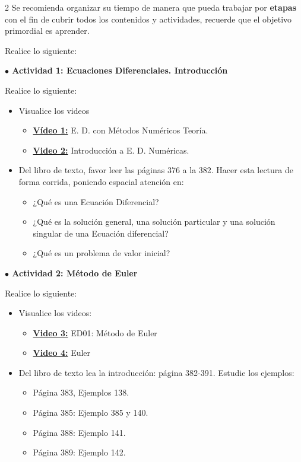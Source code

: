 \documentclass[10pt,letterpaper]{article}
\newcommand{\URLVideoUno}{\href{https://youtu.be/ajYx1_p9ENk?si=HcU6I23R4iOyACXt}{\textbf{Vídeo 1:}} E. D. con Métodos Numéricos Teoría}
\newcommand{\URLVideoDos}{\href{https://drive.google.com/file/d/16GAE1hLeBJZZ_wsUSGfVm6QBWMIPFX5s/view}{\textbf{Video 2:}} Introducción a E. D. Numéricas}
\newcommand{\URLVideoTres}{\href{https://youtu.be/-z-xH9WdpSs}{\textbf{Video 3:}} ED01: Método de Euler}
\newcommand{\URLVideoCuatro}{\href{https://drive.google.com/file/d/1cLupAmFHfxKZ5KFbxQljqTgPBWySScXh/view}{\textbf{Video 4:}} Euler}
\begin{document}


\newpage

\begin{multicols}{2}
Se recomienda organizar su tiempo de manera que pueda trabajar por \textbf{etapas} con el fin de cubrir todos los contenidos y actividades, recuerde que el objetivo primordial es aprender. 
	 

Realice lo siguiente:
	
{\color{actividades} \textbf{  $\bullet$ Actividad 1: Ecuaciones Diferenciales. Introducción}}

Realice lo siguiente:
\begin{itemize}
\item Visualice los videos
\begin{itemize}
\item \URLVideoUno.
\item \URLVideoDos.
\end{itemize}
\item Del libro de texto, favor leer las páginas 376 a la 382. Hacer esta lectura de forma corrida, poniendo espacial atención en:
\begin{itemize}
\item ¿Qué es una Ecuación Diferencial?
\item ¿Qué es la solución general, una solución particular y una solución singular de una Ecuación diferencial?
\item ¿Qué es un problema de valor inicial?
\end{itemize}
\end{itemize}

{\color{actividades} \textbf{  $\bullet$ Actividad 2: Método de Euler}}

Realice lo siguiente:
\begin{itemize}
\item Visualice los videos:
\begin{itemize}
\item \URLVideoTres
\item \URLVideoCuatro
\end{itemize}
\item Del libro de texto lea la introducción: página 382-391. Estudie los ejemplos:
\begin{itemize}
\item Página 383, Ejemplos 138. 
\item Página 385: Ejemplo 385 y 140. 
\item Página 388: Ejemplo 141. 
\item Página 389: Ejemplo 142.


\end{itemize}
\end{itemize}
\end{multicols}
\end{document}
